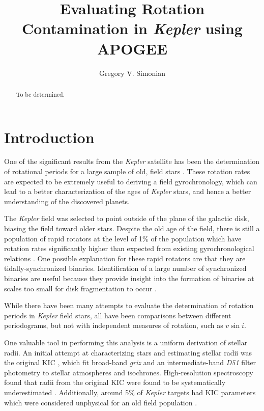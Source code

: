 \documentclass[manuscript]{aastex6}
\newcommand{\vsini}{\ensuremath{v \sin i}}
\newcommand{\Kepler}{\mbox{\textit{Kepler}}}
\begin{document}
\title{Evaluating Rotation Contamination in \Kepler{} using APOGEE}
\author{Gregory V. Simonian}

\begin{abstract}
To be determined.
\end{abstract}

\section{Introduction}

One of the significant results from the \Kepler{} satellite has been the
determination of rotational periods for a large sample of old, field stars
\citep{Basri11,Affer12,Nielsen13,Reinhold13,McQuillan14,Garcia14}.
These rotation rates are expected to be extremely useful to deriving a field
gyrochronology, which can lead to a better characterization of the ages of
\Kepler{} stars, and hence a better understanding of the discovered planets.

The \Kepler{} field was selected to point outside of the plane of the galactic
disk, biasing the field toward older stars. Despite the old age of the
field, there is still a population of rapid rotators at the level of 1\% of the
population which have rotation rates significantly higher than expected from
existing gyrochronological relations \citep{McQuillan14}. One possible 
explanation for these rapid
rotators are that they are tidally-synchronized binaries. Identification
of a large number of synchronized
binaries are useful because they provide insight into the formation of binaries
at scales too small for disk fragmentation to occur \citep{Bonnell14}. 

While there have been many attempts to evaluate the determination of rotation
periods in \Kepler{} field stars, all have been 
comparisons between different periodograms, but not with independent 
measures of rotation, such as \vsini.

One valuable tool in performing this analysis is a uniform derivation
of stellar radii. An initial attempt at characterizing stars and
estimating stellar radii was the original KIC \citep{Brown11}, which fit 
broad-band \textit{griz} and an intermediate-band \textit{D51} filter 
photometry to \citet{Castelli04} stellar atmospheres and \citet{Girardi00} 
isochrones. High-resolution spectroscopy found that radii from the original 
KIC were found 
to be systematically underestimated \citep{Everett13}. Additionally, around 5\%
of \Kepler{} targets had KIC parameters which were considered unphysical for an 
old field population \citep{Batalha13}. 
\end{document}
